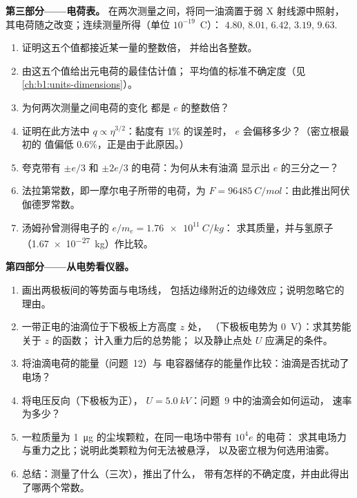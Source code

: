 \begin{problem}
\medskip
\noindent\textbf{第三部分——电荷表。}
在两次测量之间，将同一油滴置于弱 X 射线源中照射，
其电荷随之改变；连续测量所得（单位 $10^{-19}$~C）：
$4.80$, $8.01$, $6.42$, $3.19$, $9.63$.
\begin{enumerate}[resume]
  \item 证明这五个值都接近某一量的整数倍，
        并给出各整数。
  \item 由这五个值给出元电荷的最佳估计值；
        平均值的标准不确定度（见\cref{ch:b1:units-dimensions}）。
  \item 为何两次测量之间电荷的变化
        都是 $e$ 的整数倍？
  \item 证明在此方法中 $q \propto \eta^{3/2}$：黏度有 $1\%$ 的误差时，
        $e$ 会偏移多少？（密立根最初的
        值偏低 $0.6\%$，正是由于此原因。）
  \item 夸克带有 $\pm e/3$ 和 $\pm 2e/3$ 的电荷：为何从未有油滴
        显示出 $e$ 的三分之一？
  \item 法拉第常数，即一摩尔电子所带的电荷，为
        $F = \qty{96485}{C/mol}$：由此推出阿伏伽德罗常数。
  \item 汤姆孙曾测得电子的 $e/m_e = \qty{1.76e11}{C/kg}$：
        求其质量，并与氢原子
        （\qty{1.67e-27}{kg}）作比较。
\end{enumerate}

\medskip
\noindent\textbf{第四部分——从电势看仪器。}
\begin{enumerate}[resume]
  \item 画出两极板间的等势面与电场线，
        包括边缘附近的边缘效应；说明忽略它的理由。
  \item 一带正电的油滴位于下极板上方高度 $z$ 处，
        （下极板电势为 \qty{0}{V}）：求其势能关于 $z$ 的函数；
        计入重力后的总势能；
        以及静止点处 $U$ 应满足的条件。
  \item 将油滴电荷的能量（问题~12）与
        电容器储存的能量作比较：油滴是否扰动了电场？
  \item 将电压反向（下极板为正），
        $U = \qty{5.0}{kV}$：问题~9 中的油滴会如何运动，
        速率为多少？
  \item 一粒质量为 \qty{1}{\micro g} 的尘埃颗粒，在同一电场中带有 $10^4e$ 的电荷：
        求其电场力与重力之比；说明此类颗粒为何无法被悬浮，
        以及密立根为何选用油雾。
  \item 总结：测量了什么（三次），推出了什么，
        带有怎样的不确定度，并由此得出了哪两个常数。
\end{enumerate}
\end{problem}
